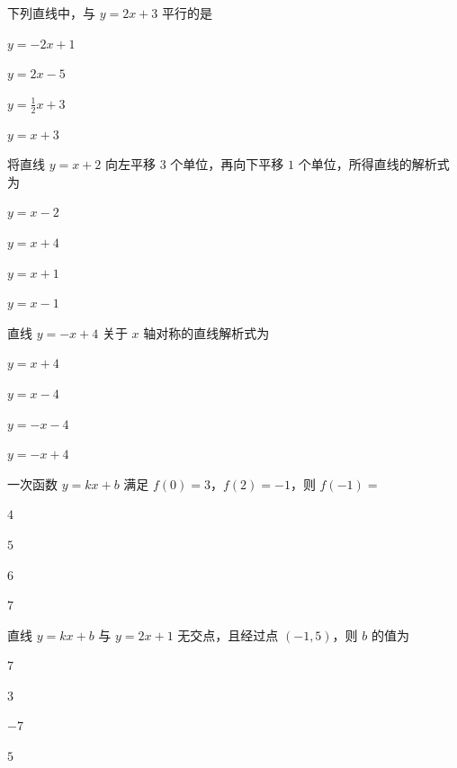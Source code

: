 \documentclass{exam-zh}
\begin{document}
\begin{question}[points=5]
  下列直线中，与 $y = 2x + 3$ 平行的是
  \begin{choices}
    \item $y = -2x + 1$
    \item $y = 2x - 5$
    \item $y = \frac{1}{2}x + 3$
    \item $y = x + 3$
  \end{choices}
\end{question}



\begin{question}[points=5]
  将直线 $y = x + 2$ 向左平移 $3$ 个单位，再向下平移 $1$ 个单位，所得直线的解析式为
  \begin{choices}
    \item $y = x - 2$
    \item $y = x + 4$
    \item $y = x + 1$
    \item $y = x - 1$
  \end{choices}
\end{question}



\begin{question}[points=5]
  直线 $y = -x + 4$ 关于 $x$ 轴对称的直线解析式为
  \begin{choices}
    \item $y = x + 4$
    \item $y = x - 4$
    \item $y = -x - 4$
    \item $y = -x + 4$
  \end{choices}
\end{question}



\begin{question}[points=5]
  一次函数 $y = kx + b$ 满足 $f(0) = 3$，$f(2) = -1$，则 $f(-1) = $
  \begin{choices}
    \item $4$
    \item $5$
    \item $6$
    \item $7$
  \end{choices}
\end{question}



\begin{question}[points=5]
  直线 $y = kx + b$ 与 $y = 2x + 1$ 无交点，且经过点 $(-1, 5)$，则 $b$ 的值为
  \begin{choices}
    \item $7$
    \item $3$
    \item $-7$
    \item $5$
  \end{choices}
\end{question}
\end{document}

